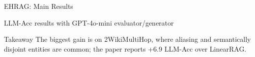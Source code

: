 \begin{frame}{EHRAG: Main Results}
\scriptsize
\begin{block}{LLM-Acc results with GPT-4o-mini evaluator/generator}
\centering
{}
\end{block}
\begin{block}{Takeaway}
The biggest gain is on 2WikiMultiHop, where aliasing and semantically disjoint entities are common; the paper reports +6.9 LLM-Acc over LinearRAG.
\end{block}
\end{frame}
